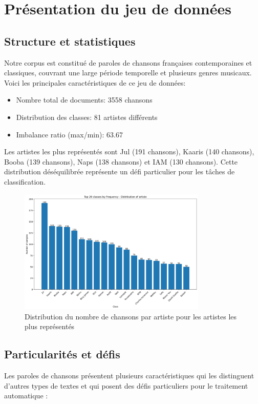 \documentclass[a4paper,11pt]{article}
\begin{document}
\section{Présentation du jeu de données}
\label{sec:dataset}

\subsection{Structure et statistiques}
Notre corpus est constitué de paroles de chansons françaises contemporaines et classiques, couvrant une large période temporelle et plusieurs genres musicaux. Voici les principales caractéristiques de ce jeu de données:

\begin{itemize}
    \item Nombre total de documents: 3558 chansons
    \item Distribution des classes: 81 artistes différents
    \item Imbalance ratio (max/min): 63.67
\end{itemize}

Les artistes les plus représentés sont Jul (191 chansons), Kaaris (140 chansons), Booba (139 chansons), Naps (138 chansons) et IAM (130 chansons). Cette distribution déséquilibrée représente un défi particulier pour les tâches de classification.

\begin{figure}[ht]
    \centering
    \includegraphics[width=0.8\textwidth]{dataset_analysis.png}
    \caption{Distribution du nombre de chansons par artiste pour les artistes les plus représentés}
    \label{fig:artist-distribution}
\end{figure}

\subsection{Particularités et défis}
Les paroles de chansons présentent plusieurs caractéristiques qui les distinguent d'autres types de textes et qui posent des défis particuliers pour le traitement automatique :
\end{document}
